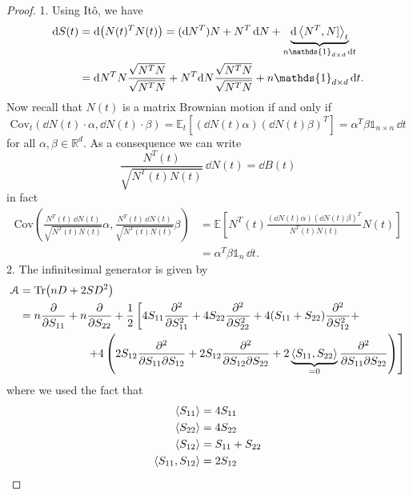 \begin{proof} %
    1. Using Itô, we have
    \begin{align*}
        \dd S(t) &= \dd(N(t)^TN(t)) = (\dd N^T)N + N^T\,\dd N + \underbrace{\dd\expval{N^T,N]}_t}_{n\mathds{1}_{d\times d}\,\dd t} \\
        &=
        \dd N^TN\frac{\sqrt{N^TN}}{\sqrt{N^TN}} + N^T\dd N \frac{\sqrt{N^TN}}{\sqrt{N^TN}} + n\mathds{1}_{d\times d}\,\dd t.
    \end{align*}
    Now recall that $N(t)$ is a matrix Brownian motion if and only if
    \begin{equation*}
        \text{Cov}_t(\dd N(t)\cdot\alpha, \dd N(t)\cdot\beta) = \mathbb{E}_t[(\dd N(t)\alpha)(\dd N(t)\beta)^T] = \alpha^T\beta\mathds{1}_{n\times n}\,\dd t
    \end{equation*}
    for all $\alpha,\beta\in\mathbb{R}^d$. As a consequence we can write
    \begin{equation*}
        \frac{N^T(t)}{\sqrt{N^T(t)N(t)}}\,\dd N(t) = \dd B(t)
    \end{equation*}
    in fact
    \begin{align*}
        \text{Cov}\left(\frac{N^T(t)\,\dd N(t)}{\sqrt{N^T(t)N(t)}}\alpha, \frac{N^T(t)\,\dd N(t)}{\sqrt{N^T(t)N(t)}}\beta\right) &= \mathbb{E}\left[N^T(t)\frac{(\dd N(t)\alpha)(\dd N(t)\beta)^T}{N^T(t)N(t)}N(t)\right] \\
        &=
        \alpha^T\beta\mathds{1}_n\,\dd t.
    \end{align*}
    2. The infinitesimal generator is given by
    \begin{align*}
        \mathcal{A} &= \Tr(nD+2SD^2) \\
        &=
        n\pdv{}{S_{11}} + n\pdv{}{S_{22}} + \frac{1}{2}\left[4S_{11}\pdv[2]{}{S_{11}} + 4S_{22}\pdv[2]{}{S_{22}} + 4(S_{11}+S_{22})\pdv[2]{}{S_{12}} + \right.\\
        &\qquad\qquad\qquad
        \left. + 4\left(2S_{12}\pdv{}{S_{11}}{S_{12}} + 2S_{12}\pdv{}{S_{12}}{S_{22}} + 2\underbrace{\expval{S_{11},S_{22}}}_{=0}\pdv{}{S_{11}}{S_{22}}\right)\right]
    \end{align*}
    where we used the fact that
    \begin{align*}
        \expval{S_{11}} &= 4S_{11} \\
        \expval{S_{22}} &= 4S_{22} \\
        \expval{S_{12}} &= S_{11} + S_{22} \\
        \expval{S_{11},S_{12}} &= 2S_{12} \\

\end{align*}
\end{proof}
